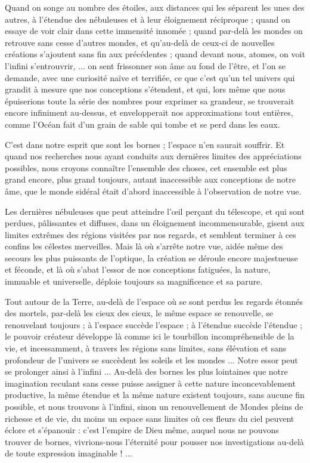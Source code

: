 \documentclass[a4paper, 11pt, oneside]{article}
\begin{document}
Quand on songe au nombre des étoiles, aux distances qui les séparent les unes des autres, à l'étendue des nébuleuses et à leur éloignement réciproque ; quand on essaye de voir clair dans cette immensité innomée ; quand par-delà les mondes on retrouve sans cesse d'autres mondes, et qu'au-delà de ceux-ci de nouvelles créations s'ajoutent sans fin aux précédentes ; quand devant nous, atomes, on voit l'infini s'entrouvrir, ... on sent frissonner son âme au fond de l'être, et l'on se demande, avec une curiosité naïve et terrifiée, ce que c'est qu'un tel univers qui grandit à mesure que nos conceptions s'étendent, et qui, lors même que nous épuiserions toute la série des nombres pour exprimer sa grandeur, se trouverait encore infiniment au-dessus, et envelopperait nos approximations tout entières, comme l'Océan fait d'un grain de sable qui tombe et se perd dans les eaux.

C'est dans notre esprit que sont les bornes ; l'espace n'en saurait souffrir. Et quand nos recherches nous ayant conduits aux dernières limites des appréciations possibles, nous croyons connaître l'ensemble des choses, cet ensemble est plus grand encore, plus grand toujours, autant inaccessible aux conceptions de notre âme, que le monde sidéral était d'abord inaccessible à l'observation de notre vue.

Les dernières nébuleuses que peut atteindre l'œil perçant du télescope, et qui sont perdues, pâlissantes et diffuses, dans un éloignement incommensurable, gisent aux limites extrêmes des régions visitées par nos regards, et semblent terminer à ces confins les célestes merveilles. Mais là où s'arrête notre vue, aidée même des secours les plus puissants de l'optique, la création se déroule encore majestueuse et féconde, et là où s'abat l'essor de nos conceptions fatiguées, la nature, immuable et universelle, déploie toujours sa magnificence et sa parure.

Tout autour de la Terre, au-delà de l'espace où se sont perdus les regards étonnés des mortels, par-delà les cieux des cieux, le même espace se renouvelle, se renouvelant toujours ; à l'espace succède l'espace ; à l'étendue succède l'étendue ; le pouvoir créateur développe là comme ici le tourbillon incompréhensible de la vie, et incessamment, à travers les régions sans limites, sans élévation et sans profondeur de l'univers se succèdent les soleils et les mondes ... Notre essor peut se prolonger ainsi à l'infini ... Au-delà des bornes les plus lointaines que notre imagination reculant sans cesse puisse assigner à cette nature inconcevablement productive, la même étendue et la même nature existent toujours, sans aucune fin possible, et nous trouvons à l'infini, sinon un renouvellement de Mondes pleins de richesse et de vie, du moins un espace sans limites où ces fleurs du ciel peuvent éclore et s'épanouir : c'est l'empire de Dieu même, auquel nous ne pouvons trouver de bornes, vivrions-nous l'éternité pour pousser nos investigations au-delà de toute expression imaginable ! ...
\end{document}
